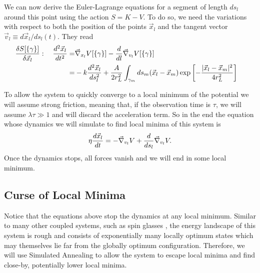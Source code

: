 \documentclass[linenumbers,endfloats,nofootinbib,preprint,floatfix,titlepage,superscriptaddress]{revtex4-1} %
\newcommand{\outNim}[1]{}
\begin{document}
\outNim{
{
\color{red} !!! Needs correction!!!}
\[K_l [\gamma_l]\equiv \int_{\gamma_l} dl \left|d^2 \vec{x}_l \over dt dl\right|^2.\]
} %

We can now derive the Euler-Lagrange equations for a segment of length $ds_l$ around this point using the action $S = K- V$. To do so, we need the variations with respect to both the position of the points $\vec{x}_l$ and the tangent vector $\vec{v}_l \equiv  d\vec{x}_l/ds_l(t)$. They read 
\begin{align} 
{\delta S[\{\gamma\}] \over \delta \vec{x}_l} : \quad {d^2 \vec{x}_l \over dt^2 }  
=&  \vec{\nabla}_{{x}_l} V[\{\gamma\}]- {d\over dl} \vec{\nabla}_{{v}_l} V[\{\gamma\}] \cr
=& -k {d^2\vec{x}_l\over ds_l^2} + {A\over 2 r_L^2}\int_{\gamma_m} ds_m
 (\vec{x}_l-\vec{x}_m)\exp\left[- {|\vec{x}_l-\vec{x}_m|^2 \over 4 r_L^2}\right]
\end{align}


To allow the system to quickly converge to a local minimum of the potential we will assume strong friction, meaning that, if the observation time is $\tau$, we will assume $\lambda \tau \gg 1$ and will discard the acceleration term. So in the end the equation whose dynamics we will simulate to find local minima of this system is 
\begin{equation}
\eta {d \vec{x}_l \over dt }  
= - \vec{\nabla}_{{v}_l} V + {d\over ds_l} \vec{\nabla}_{{v}_l} V\label{eq:Langevin1}.
\end{equation}
Once the dynamics stops, all forces vanish and we will end in some local minimum. 


\subsection{Curse of Local Minima \label{ap:np}}
Notice that the equations above stop the dynamics at any local minimum. 
Similar to many other coupled systems, such as spin glasses \citep{parisi2002physical,pelissetto2002critical}, the energy landscape of this system is rough and consists of exponentially many locally optimum states which may themselves lie far from the globally optimum configuration. 
Therefore, we will use Simulated Annealing to allow the system to escape local minima and find close-by, potentially lower local minima.  
\end{document}
